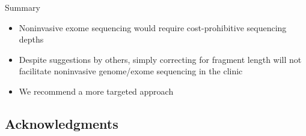 \documentclass[
  10pt,
  ignorenonframetext,
  m]{beamer}
\begin{document}
\begin{frame}{Summary}
\protect\hypertarget{summary}{}

\begin{itemize}
\item
  Noninvasive exome sequencing would require cost-prohibitive sequencing
  depths
\item
  Despite suggestions by others, simply correcting for fragment length
  will not facilitate noninvasive genome/exome sequencing in the clinic
\item
  We recommend a more targeted approach
\end{itemize}

\end{frame}

\hypertarget{acknowledgments}{%
\subsection*{Acknowledgments}\label{acknowledgments}}
\end{document}

